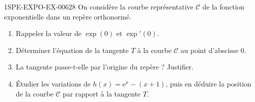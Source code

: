 \begin{exercice}{1SPE-EXPO-EX-006}{2}{8}
On considère la courbe représentative $\mathcal{C}$ de la fonction exponentielle dans un repère orthonormé.
\begin{enumerate}
\item Rappeler la valeur de $\exp(0)$ et $\exp'(0)$.
\item Déterminer l'équation de la tangente $T$ à la courbe $\mathcal{C}$ au point d'abscisse $0$.
\item La tangente passe-t-elle par l'origine du repère ? Justifier.
\item Étudier les variations de $h(x)=\mathrm{e}^x-(x+1)$, puis en déduire la position de la courbe $\mathcal{C}$ par rapport à la tangente $T$.
\end{enumerate}
\end{exercice}

